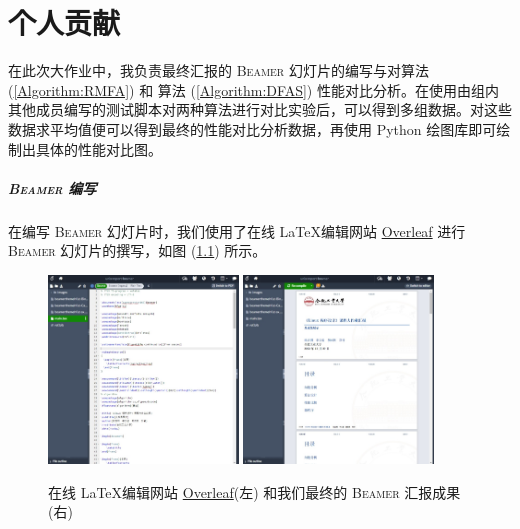 
\chapter{个人贡献}

在此次大作业中，我负责最终汇报的 \textsc{Beamer} 幻灯片的编写与对算法 (\ref{Algorithm:RMFA}) 和 算法 (\ref{Algorithm:DFAS}) 性能对比分析。在使用由组内其他成员编写的测试脚本对两种算法进行对比实验后，可以得到多组数据。对这些数据求平均值便可以得到最终的性能对比分析数据，再使用 Python 绘图库即可绘制出具体的性能对比图。

\paragraph{\textsc{Beamer} 编写}

在编写 \textsc{Beamer} 幻灯片时，我们使用了在线 \LaTeX 编辑网站 \href{https://www.overleaf.com/}{Overleaf} 进行 \textsc{Beamer} 幻灯片的撰写，如图 (\ref{Overleaf}) 所示。
\begin{figure}[htb]
    \centering
    \includegraphics[width=0.45\textwidth]{figures/Overleaf.jpeg}
    \qquad
    \includegraphics[width=0.45\textwidth]{figures/Beamer.jpeg}
    \caption{在线 \LaTeX 编辑网站 \href{https://www.overleaf.com/}{Overleaf}(左) 和我们最终的 \textsc{Beamer} 汇报成果(右)}
    \label{Overleaf}
\end{figure}

